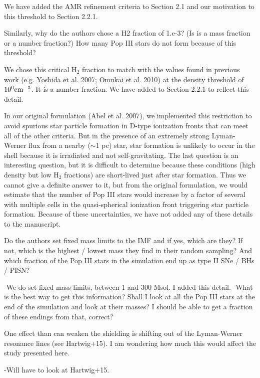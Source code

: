 \documentclass[11pt]{article}
\newenvironment{referee}[1][]{%
    \ignorespaces%
    \begin{mdframed}[style=myquotestyle,#1]%
}{%
    \end{mdframed}%
    \ignorespacesafterend%
}%
\begin{document}
We have added the AMR refinement criteria to Section 2.1 and our motivation to this threshold to Section 2.2.1.

\begin{referee}
Similarly, why do the authors chose a H2 fraction of 1.e-3? (Is is a mass fraction or a number fraction?) How many Pop III stars do not form because of this threshold?
\end{referee}

We chose this critical H$_2$ fraction to match with the values found in previous work (e.g. Yoshida et al. 2007; Omukai et al. 2010) at the density threshold of $10^6 \cubecm$.  It is a number fraction.  We have added to Section 2.2.1 to reflect this detail.

In our original formulation (Abel et al. 2007), we implemented this restriction to avoid spurious star particle formation in D-type ionization fronts that can meet all of the other criteria.  But in the presence of an extremely strong Lyman-Werner flux from a nearby ($\sim$1 pc) star, star formation is unlikely to occur in the shell because it is irradiated and not self-gravitating. The last question is an interesting question, but it is difficult to determine because these conditions (high density but low H$_2$ fractions) are short-lived just after star formation.  Thus we cannot give a definite answer to it, but from the original formulation, we would estimate that the number of Pop III stars would increase by a factor of several with multiple cells in the quasi-spherical ionization front triggering star particle formation.  Because of these uncertainties, we have not added any of these details to the manuscript.

\begin{referee}
Do the authors set fixed mass limits to the IMF and if yes, which are they?  If not, which is the highest / lowest mass they find in their random sampling?  And which fraction of the Pop III stars in the simulation end up as type II SNe / BHs / PISN?
\end{referee}
-We do set fixed mass limits, between 1 and 300 Msol. I added this detail. 
-What is the best way to get this information? Shall I look at all the Pop III stars at the end of the simulation and look at their masses? I should be able to get a fraction of these endings from that, correct?

\begin{referee}
One effect than can weaken the shielding is shifting out of the Lyman-Werner resonance lines (see Hartwig+15). I am wondering how much this would affect the study presented here.
\end{referee}
-Will have to look at Hartwig+15. 
\end{document}
